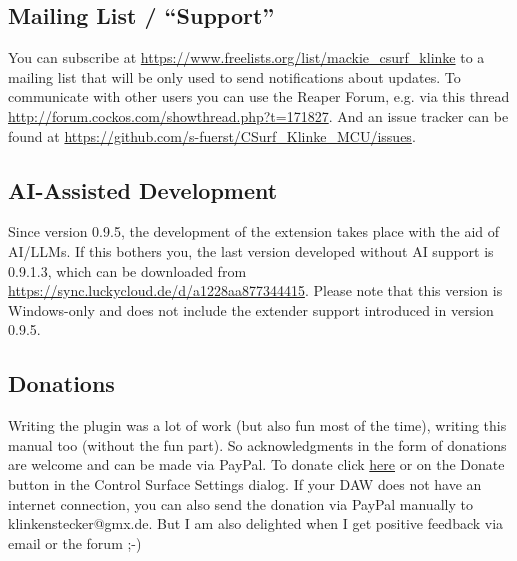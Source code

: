 \subsection{Mailing List / ``Support''}
You can subscribe at \url{https://www.freelists.org/list/mackie_csurf_klinke}
to a mailing list that will be only used to send notifications about
updates.
To communicate with other users you can use the Reaper Forum,
e.g. via this thread
\url{http://forum.cockos.com/showthread.php?t=171827}.
And an issue tracker can be found at
\url{https://github.com/s-fuerst/CSurf_Klinke_MCU/issues}.

\subsection{AI-Assisted Development}
Since version 0.9.5, the development of the extension takes place with
the aid of AI/LLMs. If this bothers you, the last version developed
without AI support is 0.9.1.3, which can be downloaded from
\url{https://sync.luckycloud.de/d/a1228aa877344415}. Please note
that this version is Windows-only and does not include the extender
support introduced in version 0.9.5.

\subsection{Donations}
Writing the plugin was a lot of work (but also fun most of the time),
writing this manual too (without the fun part). So acknowledgments in the
form of donations are welcome and can be made via PayPal. To donate click
\href{https://www.paypal.com/cgi-bin/webscr?cmd=_s-xclick&hosted_button_id=LR54GZHGL6VHA}{here}
or on the Donate button in the Control Surface Settings dialog. If your DAW
does not have an internet connection, you can also send the donation via
PayPal manually to klinkenstecker@gmx.de. But I am also delighted when I get
positive feedback via email or the \reaper forum ;-)
